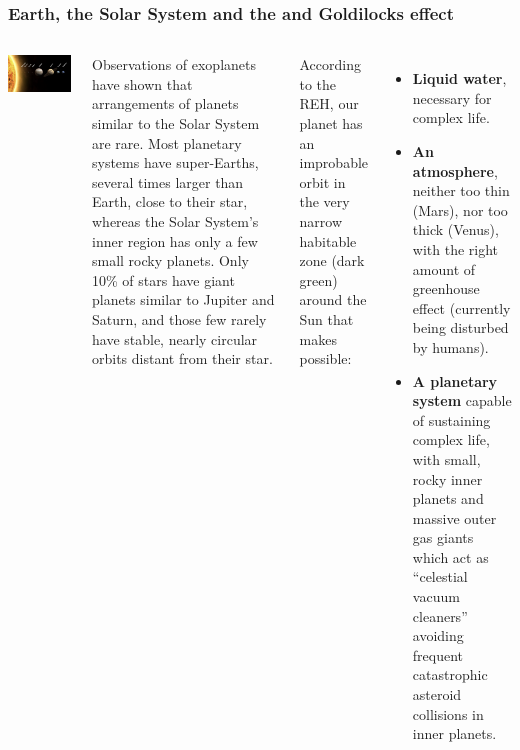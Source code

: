 \begin{frame}
\frametitle{Earth, the Solar System and the and Goldilocks effect}

\begin{columns}

\includegraphics[scale=0.35]{solarsystem}

Observations of exoplanets have shown that arrangements of planets similar to the Solar System are rare. Most planetary systems have super-Earths, several times larger than Earth, close to their star, whereas the Solar System's inner region has only a few small rocky planets. Only 10\% of stars have giant planets similar to Jupiter and Saturn, and those few rarely have stable, nearly circular orbits distant from their star.

According to the REH, our planet has an improbable orbit in the very narrow habitable zone (dark green) around the Sun that makes possible:
\begin{itemize}
\item {\bf Liquid water}, necessary for complex life.
\item {\bf An atmosphere}, neither too thin (Mars), nor too thick (Venus), with the right amount of greenhouse effect (currently being disturbed by humans).
\item {\bf A planetary system} capable of sustaining complex life, with small, rocky inner planets and massive outer gas giants which act as ``celestial vacuum cleaners'' avoiding frequent catastrophic asteroid collisions in inner planets.
 

\end{itemize}


\end{columns}
\end{frame}

